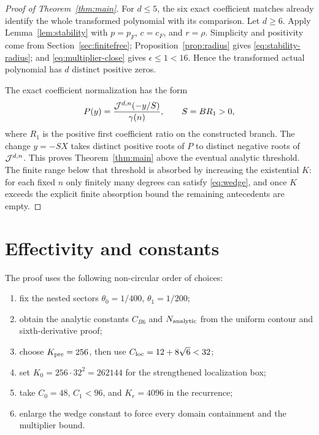 \documentclass[12pt]{article}
\begin{document}
\begin{proof}[Proof of Theorem~\ref{thm:main}]
For $d\le5$, the six exact coefficient matches already identify the whole
transformed polynomial with its comparison.  Let $d\ge6$.  Apply
Lemma~\ref{lem:stability} with $p=p_F$, $c=c_F$, and $r=\rho$.  Simplicity
and positivity come from Section~\ref{sec:finitefree};
Proposition~\ref{prop:radius} gives \eqref{eq:stability-radius}; and
\eqref{eq:multiplier-close} gives $\epsilon\le1<16$.  Hence the transformed
actual polynomial has $d$ distinct positive zeros.

The exact coefficient normalization has the form
\begin{equation}\label{eq:identify-Jensen}
 P(y)=\frac{\mathcal J^{d,n}(-y/S)}{\gamma(n)},
 \qquad S=BR_1>0,
\end{equation}
where $R_1$ is the positive first coefficient ratio on the constructed
branch.  The change $y=-SX$ takes distinct positive roots of $P$ to distinct
negative roots of $\mathcal J^{d,n}$.  This proves Theorem~\ref{thm:main} above the
eventual analytic threshold.  The finite range below that threshold is
absorbed by increasing the existential $K$: for each fixed $n$ only finitely
many degrees can satisfy \eqref{eq:wedge}, and once $K$ exceeds the explicit
finite absorption bound the remaining antecedents are empty.
\end{proof}

\section{Effectivity and constants}\label{sec:effectivity}

The proof uses the following non-circular order of choices:
\begin{enumerate}
\item fix the nested sectors $\theta_0=1/400$, $\theta_1=1/200$;
\item obtain the analytic constants $C_{B6}$ and $N_{\rm analytic}$ from the
uniform contour and sixth-derivative proof;
\item choose $K_{\rm pre}=256$, then use
$C_{\rm loc}=12+8\sqrt6<32$;
\item set $K_0=256\cdot32^2=262144$ for the strengthened localization box;
\item take $C_0=48$, $C_1<96$, and $K_r=4096$ in the recurrence;
\item enlarge the wedge constant to force every domain containment and the
multiplier bound.
\end{enumerate}
\end{document}
